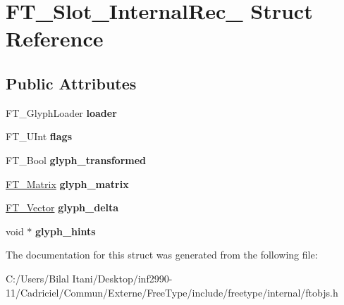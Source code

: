 \hypertarget{struct_f_t___slot___internal_rec__}{}\section{F\+T\+\_\+\+Slot\+\_\+\+Internal\+Rec\+\_\+ Struct Reference}
\label{struct_f_t___slot___internal_rec__}
\subsection*{Public Attributes}
\begin{DoxyCompactItemize}
\item 
F\+T\+\_\+\+Glyph\+Loader {\bfseries loader}\hypertarget{struct_f_t___slot___internal_rec___ac57f8c939f667938ab9f986088c15d8f}{}\label{struct_f_t___slot___internal_rec___ac57f8c939f667938ab9f986088c15d8f}

\item 
F\+T\+\_\+\+U\+Int {\bfseries flags}\hypertarget{struct_f_t___slot___internal_rec___a9a2a287ba2b363197b36fe24d2f48746}{}\label{struct_f_t___slot___internal_rec___a9a2a287ba2b363197b36fe24d2f48746}

\item 
F\+T\+\_\+\+Bool {\bfseries glyph\+\_\+transformed}\hypertarget{struct_f_t___slot___internal_rec___ac2bba891ac70016b74c085a05c1f182c}{}\label{struct_f_t___slot___internal_rec___ac2bba891ac70016b74c085a05c1f182c}

\item 
\hyperlink{struct_f_t___matrix__}{F\+T\+\_\+\+Matrix} {\bfseries glyph\+\_\+matrix}\hypertarget{struct_f_t___slot___internal_rec___a95af217daf1c2080692b5a69e345aa3b}{}\label{struct_f_t___slot___internal_rec___a95af217daf1c2080692b5a69e345aa3b}

\item 
\hyperlink{struct_f_t___vector__}{F\+T\+\_\+\+Vector} {\bfseries glyph\+\_\+delta}\hypertarget{struct_f_t___slot___internal_rec___a2a94b955dd1e260aaf8699238d44769d}{}\label{struct_f_t___slot___internal_rec___a2a94b955dd1e260aaf8699238d44769d}

\item 
void $\ast$ {\bfseries glyph\+\_\+hints}\hypertarget{struct_f_t___slot___internal_rec___a16337853823cdccfb0c636673c4eb3ae}{}\label{struct_f_t___slot___internal_rec___a16337853823cdccfb0c636673c4eb3ae}

\end{DoxyCompactItemize}


The documentation for this struct was generated from the following file\+:\begin{DoxyCompactItemize}
\item 
C\+:/\+Users/\+Bilal Itani/\+Desktop/inf2990-\/11/\+Cadriciel/\+Commun/\+Externe/\+Free\+Type/include/freetype/internal/ftobjs.\+h\end{DoxyCompactItemize}
